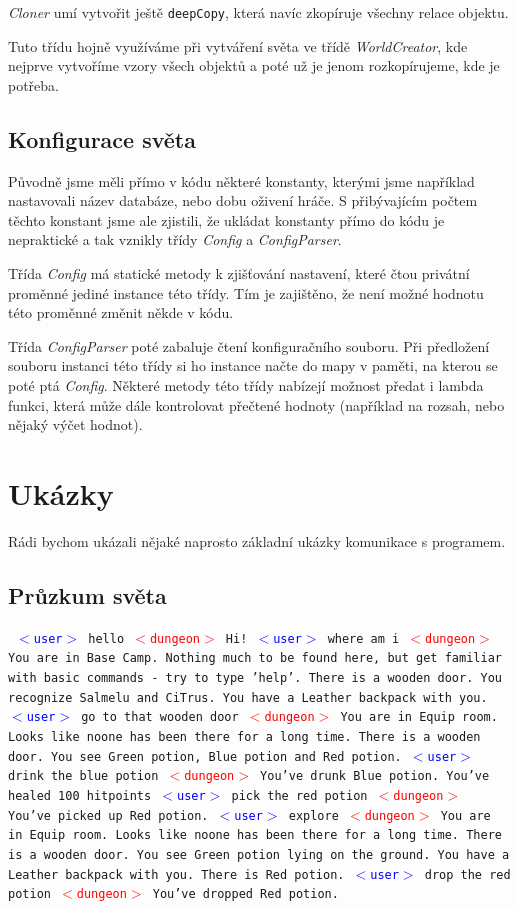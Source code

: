 \documentclass[11pt, a4paper]{article}
\def\class#1{\emph{#1}}
\newenvironment{example}%
{\smallskip\noindent\ignorespaces\obeylines\tt}%
{\smallskip\par\noindent
\ignorespacesafterend}
\def\user{\textcolor{blue}{$<$user$>$ }}
\def\dung{\textcolor{red}{$<$dungeon$>$ }}
\begin{document}
\class{Cloner} umí vytvořit ještě \texttt{deepCopy}, která navíc zkopíruje všechny relace objektu.

Tuto třídu hojně využíváme při vytváření světa ve třídě \class{WorldCreator}, kde nejprve vytvoříme vzory všech objektů a poté už je jenom rozkopírujeme, kde je potřeba.

\subsection{Konfigurace světa}

Původně jsme měli přímo v kódu některé konstanty, kterými jsme například nastavovali název databáze, nebo dobu oživení hráče. S přibývajícím počtem těchto konstant jsme ale zjistili, že ukládat konstanty přímo do kódu je nepraktické a tak vznikly třídy \class{Config} a \class{ConfigParser}. 

Třída \class{Config} má statické metody k zjišťování nastavení, které čtou privátní proměnné jediné instance této třídy. Tím je zajištěno, že není možné hodnotu této proměnné změnit někde v kódu. 

Třída \class{ConfigParser} poté zabaluje čtení konfiguračního souboru. Při předložení souboru instanci této třídy si ho instance načte do mapy v paměti, na kterou se poté ptá \class{Config}. Některé metody této třídy nabízejí možnost předat i lambda funkci, která může dále kontrolovat přečtené hodnoty (například na rozsah, nebo nějaký výčet hodnot).

\section{Ukázky}

Rádi bychom ukázali nějaké naprosto základní ukázky komunikace s programem.
\subsection{Průzkum světa}

\begin{example}
\user hello
\dung Hi!
\user where am i
\dung You are in Base Camp. Nothing much to be found here, but get
familiar with basic commands - try to type 'help'. There is a wooden
door. You recognize Salmelu and CiTrus. You have a Leather backpack 
with you.
\user go to that wooden door
\dung You are in Equip room. Looks like noone has been there for 
a long time. There is a wooden door. You see Green potion, Blue potion 
and Red potion. 
\user drink the blue potion
\dung You've drunk Blue potion. You've healed 100 hitpoints
\user pick the red potion
\dung You've picked up Red potion.
\user explore
\dung You are in Equip room. Looks like noone has been there for 
a long time. There is a wooden door. You see Green potion lying on the 
ground. You have a Leather backpack with you. There is Red potion.
\user drop the red potion
\dung You've dropped Red potion. 
\end{example}
\end{document}
